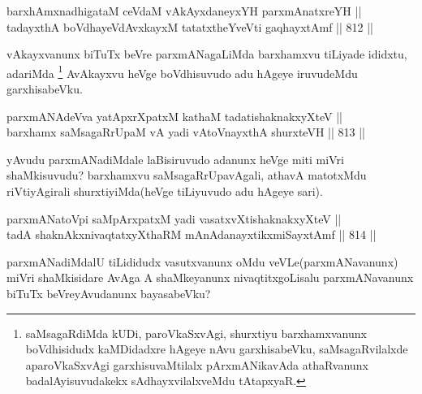 
\begin{shl}
barxhAmxnadhigataM ceVdaM vAkAyxdaneyxYH parxmAnatxreYH || \\
tadayxthA boVdhayeVdAvxkayxM tatatxtheYveVti gaqhayxtAmf \hfill || 812 ||  
\end{shl}

\begin{artha}
vAkayxvanunx biTuTx beVre parxmANagaLiMda barxhamxvu tiLiyade ididxtu, adariMda \footnote{saMsagaRdiMda kUDi, paroVkaSxvAgi, shurxtiyu barxhamxvanunx boVdhisidudx kaMDidadxre hAgeye nAvu garxhisabeVku, saMsagaRvilalxde aparoVkaSxvAgi garxhisuvaMtilalx pArxmANikavAda athaRvanunx badalAyisuvudakekx sAdhayxvilalxveMdu tAtapxyaR.} AvAkayxvu heVge boVdhisuvudo adu hAgeye iruvudeMdu garxhisabeVku.
\end{artha}


\begin{shl}
parxmANAdeVva yatApxrXpatxM kathaM tadatishaknakxyXteV || \\
barxhamx saMsagaRrUpaM vA yadi vA\s toV\s nayxthA shurxteVH \hfill || 813 ||  
\end{shl}

\begin{artha}
yAvudu parxmANadiMdale laBisiruvudo adanunx heVge miti miVri shaMkisuvudu? barxhamxvu saMsagaRrUpavAgali, athavA matotxMdu riVtiyAgirali shurxtiyiMda(heVge tiLiyuvudo adu hAgeye sari).
\end{artha}

\begin{shl}
parxmANatoV\s pi saMpArxpatxM yadi vasatxvXtishaknakxyXteV || \\
tadA shaknAkxnivaqtatxyXthaRM mAnAdanayxtikxmiSayxtAmf \hfill || 814 ||  
\end{shl}

\begin{artha}
parxmANadiMdalU tiLididudx vasutxvanunx oMdu veVLe(parxmANavanunx) miVri shaMkisidare AvAga A shaMkeyanunx nivaqtitxgoLisalu parxmANavanunx biTuTx beVreyAvudanunx bayasabeVku?
\end{artha}


